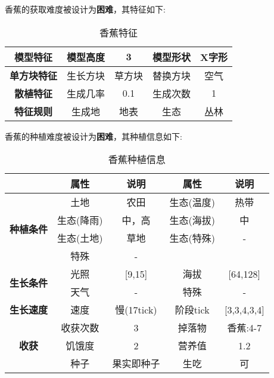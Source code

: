 香蕉的获取难度被设计为\textbf{困难}，其特征如下:
\begin{table}[H]
    \centering
    \caption{香蕉特征}
    \label{table:香蕉特征}
    \setlength{\tabcolsep}{4mm}
    \begin{tabular}{c|cc|cc}
        \toprule
        \textbf{模型特征}   & 模型高度 & 3      & 模型形状 & X字形 \\
        \midrule
        \textbf{单方块特征} & 生长方块 & 草方块 & 替换方块 & 空气  \\
        \midrule
        \textbf{散植特征}   & 生成几率 & 0.1    & 生成次数 & 1     \\
        \midrule
        \textbf{特征规则}   & 生成地   & 地表   & 生态     & 丛林  \\
        \bottomrule
    \end{tabular}
\end{table}


香蕉的种植难度被设计为\textbf{困难}，其种植信息如下:

\begin{table}[H]
    \centering
    \caption{香蕉种植信息}
    \label{table:香蕉种植信息}
    \setlength{\tabcolsep}{4mm}
    \begin{tabular}{c|cc|cc}
        \toprule
                                           & \textbf{属性} & \textbf{说明} & \textbf{属性} & \textbf{说明} \\
        \midrule
        \multirow{4}{*}{\textbf{种植条件}} & 土地          & 农田          & 生态(温度)    & 热带          \\
                                           & 生态(降雨)    & 中，高        & 生态(海拔)    & 中            \\
                                           & 生态(土地)    & 草地          & 生态(特殊)    & -             \\
                                           & 特殊          & -                                             \\
        \midrule
        \multirow{2}{*}{\textbf{生长条件}} & 光照          & [9,15]        & 海拔          & [64,128]      \\
                                           & 天气          & -             & 特殊          & -             \\
        \midrule
        \textbf{生长速度}                  & 速度          & 慢(17tick)    & 阶段tick      & [3,3,4,3,4]   \\
        \midrule
        \multirow{3}{*}{\textbf{收获}}     & 收获次数      & 3             & 掉落物        & 香蕉:4-7      \\
                                           & 饥饿度        & 2             & 营养值        & 1.2           \\
                                           & 种子          & 果实即种子    & 生吃          & 可            \\
        \bottomrule
    \end{tabular}
\end{table}


